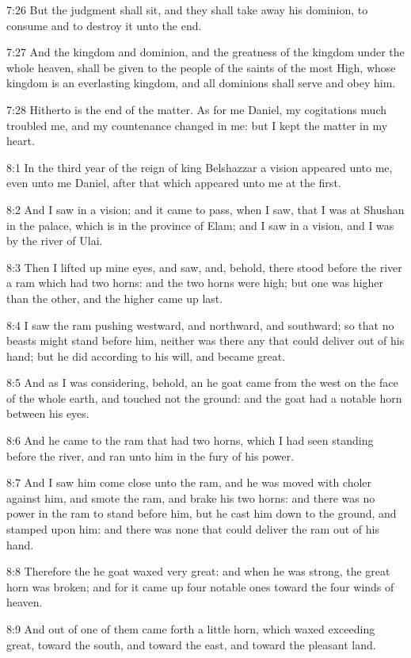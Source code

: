 7:26 But the judgment shall sit, and they shall take away his dominion, to consume and to destroy it unto the end.

7:27 And the kingdom and dominion, and the greatness of the kingdom under the whole heaven, shall be given to the people of the saints of the most High, whose kingdom is an everlasting kingdom, and all dominions shall serve and obey him.

7:28 Hitherto is the end of the matter. As for me Daniel, my cogitations much troubled me, and my countenance changed in me: but I kept the matter in my heart.

8:1 In the third year of the reign of king Belshazzar a vision appeared unto me, even unto me Daniel, after that which appeared unto me at the first.

8:2 And I saw in a vision; and it came to pass, when I saw, that I was at Shushan in the palace, which is in the province of Elam; and I saw in a vision, and I was by the river of Ulai.

8:3 Then I lifted up mine eyes, and saw, and, behold, there stood before the river a ram which had two horns: and the two horns were high; but one was higher than the other, and the higher came up last.

8:4 I saw the ram pushing westward, and northward, and southward; so that no beasts might stand before him, neither was there any that could deliver out of his hand; but he did according to his will, and became great.

8:5 And as I was considering, behold, an he goat came from the west on the face of the whole earth, and touched not the ground: and the goat had a notable horn between his eyes.

8:6 And he came to the ram that had two horns, which I had seen standing before the river, and ran unto him in the fury of his power.

8:7 And I saw him come close unto the ram, and he was moved with choler against him, and smote the ram, and brake his two horns: and there was no power in the ram to stand before him, but he cast him down to the ground, and stamped upon him: and there was none that could deliver the ram out of his hand.

8:8 Therefore the he goat waxed very great: and when he was strong, the great horn was broken; and for it came up four notable ones toward the four winds of heaven.

8:9 And out of one of them came forth a little horn, which waxed exceeding great, toward the south, and toward the east, and toward the pleasant land.

